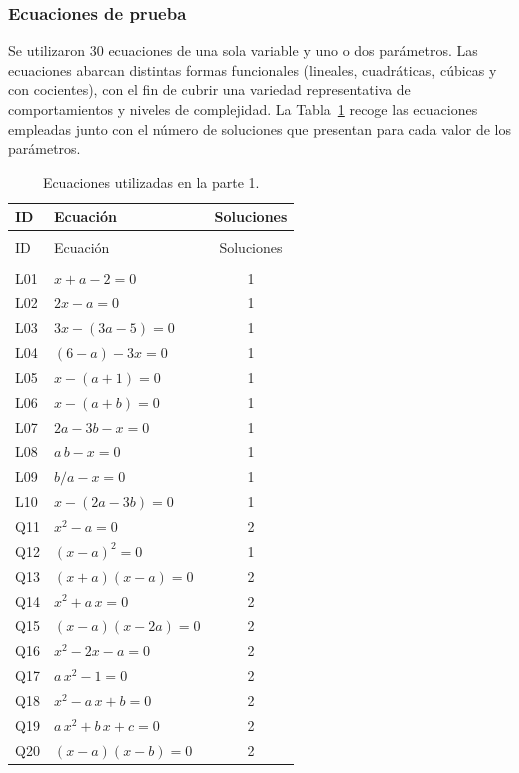 \documentclass[12pt,a4paper]{article} \usepackage[utf8]{inputenc} \usepackage[spanish]{babel} \usepackage{amsmath, amssymb, amsthm} \usepackage{bm} \usepackage{float} \usepackage{longtable} \usepackage[hidelinks]{hyperref}
\begin{document}
\subsubsection{Ecuaciones de prueba}

Se utilizaron 30 ecuaciones de una sola variable y uno o dos parámetros. Las ecuaciones abarcan distintas formas funcionales (lineales, cuadráticas, cúbicas y con cocientes), con el fin de cubrir una variedad representativa de comportamientos y niveles de complejidad. La Tabla~\ref{tab:equaciones_fase1} recoge las ecuaciones empleadas junto con el número de soluciones que presentan para cada valor de los parámetros.

\begin{longtable}{llc}
\caption{Ecuaciones utilizadas en la parte 1.} \label{tab:equaciones_fase1} \\
\hline ID & Ecuación & Soluciones \\
\hline \endfirsthead \multicolumn{3}{c}{} \\
\hline ID & Ecuación & Soluciones \\
\hline \endhead \hline \multicolumn{3}{r}{} \\
\endfoot \hline \endlastfoot L01 & $x + a - 2 = 0$ & 1 \\
L02 & $2x - a = 0$ & 1 \\
L03 & $3x - (3a-5) = 0$ & 1 \\
L04 & $(6-a) - 3x = 0$ & 1 \\
L05 & $x - (a+1) = 0$ & 1 \\
L06 & $x - (a+b) = 0$ & 1 \\
L07 & $2a - 3b - x = 0$ & 1 \\
L08 & $a\,b - x = 0$ & 1 \\
L09 & $b/a - x = 0$ & 1 \\
L10 & $x - (2a-3b) = 0$ & 1 \\
Q11 & $x^2 - a = 0$ & 2 \\
Q12 & $(x-a)^2 = 0$ & 1 \\
Q13 & $(x+a)(x-a) = 0$ & 2 \\
Q14 & $x^2 + a\,x = 0$ & 2 \\
Q15 & $(x-a)(x-2a) = 0$ & 2 \\
Q16 & $x^2 - 2x - a = 0$ & 2 \\
Q17 & $a\,x^2 - 1 = 0$ & 2 \\
Q18 & $x^2 - a\,x + b = 0$ & 2 \\
Q19 & $a\,x^2 + b\,x + c = 0$ & 2 \\
Q20 & $(x-a)(x-b) = 0$ & 2 \\

\end{longtable}
\end{document}
